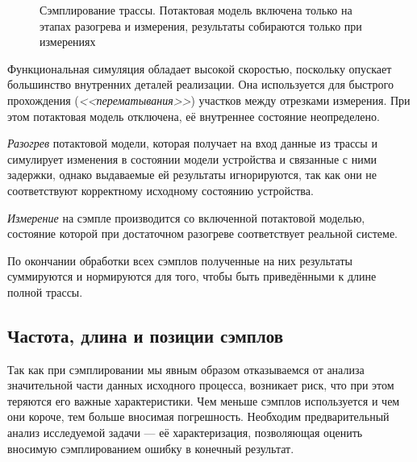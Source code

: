 \begin{figure}[htbp]
    \caption[Сэмплирование трассы]{Сэмплирование трассы. Потактовая модель включена только на этапах разогрева и измерения, результаты собираются только при измерениях}
    \label{fig:warmup}
\end{figure}


\begin{itemize*}
    \item Функциональная симуляция обладает высокой скоростью, поскольку опускает большинство внутренних деталей реализации. Она используется для быстрого прохождения (\textit{<<перематывания>>}) участков между отрезками измерения. При этом потактовая модель отключена, её внутреннее состояние неопределено.
    \item \textit{Разогрев} потактовой модели, которая получает на вход данные из трассы и симулирует изменения в состоянии модели устройства и связанные с ними задержки,  однако выдаваемые ей результаты игнорируются, так как они не соответствуют корректному исходному состоянию устройства. 
    \item \textit{Измерение} на сэмпле производится со включенной потактовой моделью, состояние которой при достаточном разогреве соответствует реальной системе.
    \item По окончании обработки всех сэмплов полученные на них результаты суммируются и нормируются для  того, чтобы быть приведёнными к длине полной трассы.
\end{itemize*}


\subsection{Частота, длина и позиции сэмплов}

Так как при сэмплировании мы явным образом отказываемся от анализа значительной части данных исходного процесса, возникает риск, что при этом теряются его важные характеристики. Чем меньше сэмплов используется и чем они короче, тем больше вносимая погрешность. Необходим предварительный анализ исследуемой задачи --- её характеризация, позволяющая оценить вносимую сэмплированием ошибку в конечный результат.

